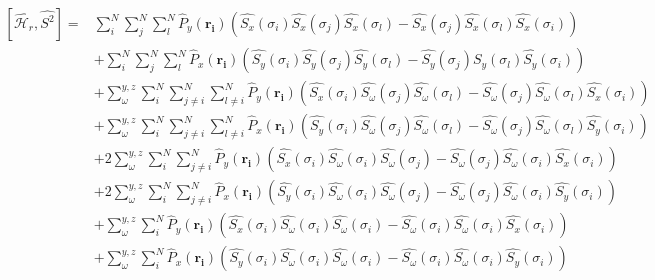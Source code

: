 \documentclass{article}
\begin{document}
\begin{equation}
\begin{split}
\label{aaa}
[\hat{\mathcal{H}_r}, \hat{S^2} ] =& \sum_{i}^{N}  \sum_{j}^{N} \sum_{l}^{N} {\hat{P}_y}{(\boldsymbol{r_i})} \left( {\hat{S_x}}(\sigma_i) \hat{S_{x}}{(\sigma_j)} \hat{S_{x}}{(\sigma_l)} -  \hat{S_{x}}{(\sigma_j)} \hat{S_{x}}{(\sigma_l)} {\hat{S_x}}(\sigma_i)\right)\\
&+ \sum_{i}^{N}  \sum_{j}^{N} \sum_{l}^{N} {\hat{P}_x}{(\boldsymbol{r_i})} \left( {\hat{S_y}}(\sigma_i) \hat{S_{y}}{(\sigma_j)} \hat{S_{y}}{(\sigma_l)} -  \hat{S_{y}}{(\sigma_j)} \hat{S_{y}}{(\sigma_l)} {\hat{S_y}}(\sigma_i)\right)\\
&+ \sum_{\omega}^{y,z} \sum_{i}^{N}  \sum_{j \neq i}^{N} \sum_{l \neq i}^{N} {\hat{P}_y}{(\boldsymbol{r_i})} \left( {\hat{S_x}}(\sigma_i) \hat{S_{\omega}}{(\sigma_j)} \hat{S_{\omega}}{(\sigma_l)} -  \hat{S_{\omega}}{(\sigma_j)} \hat{S_{\omega}}{(\sigma_l)} {\hat{S_x}}(\sigma_i)\right)\\
&+ \sum_{\omega}^{y,z} \sum_{i}^{N}  \sum_{j \neq i}^{N} \sum_{l \neq i}^{N} {\hat{P}_x}{(\boldsymbol{r_i})} \left( {\hat{S_y}}(\sigma_i) \hat{S_{\omega}}{(\sigma_j)} \hat{S_{\omega}}{(\sigma_l)} -  \hat{S_{\omega}}{(\sigma_j)} \hat{S_{\omega}}{(\sigma_l)} {\hat{S_y}}(\sigma_i)\right)\\
&+2 \sum_{\omega}^{y,z} \sum_{i}^{N}  \sum_{j \neq i}^{N}  {\hat{P}_y}{(\boldsymbol{r_i})} \left( {\hat{S_x}}(\sigma_i) \hat{S_{\omega}}{(\sigma_i)} \hat{S_{\omega}}{(\sigma_j)} -  \hat{S_{\omega}}{(\sigma_j)} \hat{S_{\omega}}{(\sigma_i)} {\hat{S_x}}(\sigma_i)\right)\\
&+2 \sum_{\omega}^{y,z} \sum_{i}^{N}  \sum_{j \neq i}^{N}  {\hat{P}_x}{(\boldsymbol{r_i})} \left( {\hat{S_y}}(\sigma_i) \hat{S_{\omega}}{(\sigma_i)} \hat{S_{\omega}}{(\sigma_j)} -  \hat{S_{\omega}}{(\sigma_j)} \hat{S_{\omega}}{(\sigma_i)} {\hat{S_y}}(\sigma_i)\right)\\
&+ \sum_{\omega}^{y,z} \sum_{i}^{N}   {\hat{P}_y}{(\boldsymbol{r_i})} \left( {\hat{S_x}}(\sigma_i) \hat{S_{\omega}}{(\sigma_i)} \hat{S_{\omega}}{(\sigma_i)} -  \hat{S_{\omega}}{(\sigma_i)} \hat{S_{\omega}}{(\sigma_i)} {\hat{S_x}}(\sigma_i)\right)\\
&+ \sum_{\omega}^{y,z} \sum_{i}^{N}   {\hat{P}_x}{(\boldsymbol{r_i})} \left( {\hat{S_y}}(\sigma_i) \hat{S_{\omega}}{(\sigma_i)} \hat{S_{\omega}}{(\sigma_i)} -  \hat{S_{\omega}}{(\sigma_i)} \hat{S_{\omega}}{(\sigma_i)} {\hat{S_y}}(\sigma_i)\right)\\
\end{split}
\end{equation}
\end{document}
